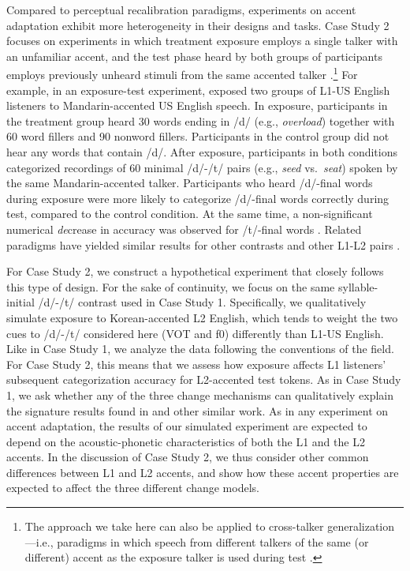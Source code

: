 \documentclass[
  11pt,
  man,floatsintext]{apa6}
\begin{document}
Compared to perceptual recalibration paradigms, experiments on accent adaptation exhibit more heterogeneity in their designs and tasks. Case Study 2 focuses on experiments in which treatment exposure employs a single talker with an unfamiliar accent, and the test phase heard by both groups of participants employs previously unheard stimuli from the same accented talker \autocites[e.g.,][]{eisner2013,schertz2015,xie2017}.\footnote{The approach we take here can also be applied to cross-talker generalization---i.e., paradigms in which speech from different talkers of the same (or different) accent as the exposure talker is used during test \autocite{baeseberk2013,bradlow-bent2008,sidaras2009}.} For example, in an exposure-test experiment, \textcite{xie2016jep} exposed two groups of L1-US English listeners to Mandarin-accented US English speech. In exposure, participants in the treatment group heard 30 words ending in /d/ (e.g., \emph{overload}) together with 60 word fillers and 90 nonword fillers. Participants in the control group did not hear any words that contain /d/. After exposure, participants in both conditions categorized recordings of 60 minimal /d/-/t/ pairs (e.g., \emph{seed} vs.~\emph{seat}) spoken by the same Mandarin-accented talker. Participants who heard /d/-final words during exposure were more likely to categorize /d/-final words correctly during test, compared to the control condition. At the same time, a non-significant numerical \emph{de}crease in accuracy was observed for /t/-final words \autocite[see also][]{xie2018lcn}. Related paradigms have yielded similar results for other contrasts and other L1-L2 pairs \autocites[e.g.,][]{zheng-samuel2020,eisner2013}.

For Case Study 2, we construct a hypothetical experiment that closely follows this type of design. For the sake of continuity, we focus on the same syllable-initial /d/-/t/ contrast used in Case Study 1. Specifically, we qualitatively simulate exposure to Korean-accented L2 English, which tends to weight the two cues to /d/-/t/ considered here (VOT and f0) differently than L1-US English. Like in Case Study 1, we analyze the data following the conventions of the field. For Case Study 2, this means that we assess how exposure affects L1 listeners' subsequent categorization accuracy for L2-accented test tokens. As in Case Study 1, we ask whether any of the three change mechanisms can qualitatively explain the signature results found in \textcite{xie2016jep} and other similar work. As in any experiment on accent adaptation, the results of our simulated experiment are expected to depend on the acoustic-phonetic characteristics of both the L1 and the L2 accents. In the discussion of Case Study 2, we thus consider other common differences between L1 and L2 accents, and show how these accent properties are expected to affect the three different change models.
\end{document}
